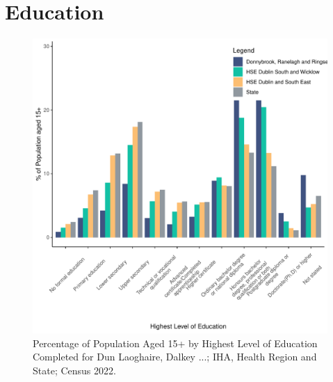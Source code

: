 \documentclass{article}
\begin{document}
\section{Education}\label{sect:Edu}
\begin{figure}[H]
	\centering
	\includegraphics[width = 120mm]{../figures/EduED.pdf}
	\caption{Percentage of Population Aged 15+ by Highest Level of Education Completed for Dun Laoghaire, Dalkey ...; IHA, Health Region and State; Census 2022.}
	\label{fig:vbnv}
	\end{figure}
\end{document}
